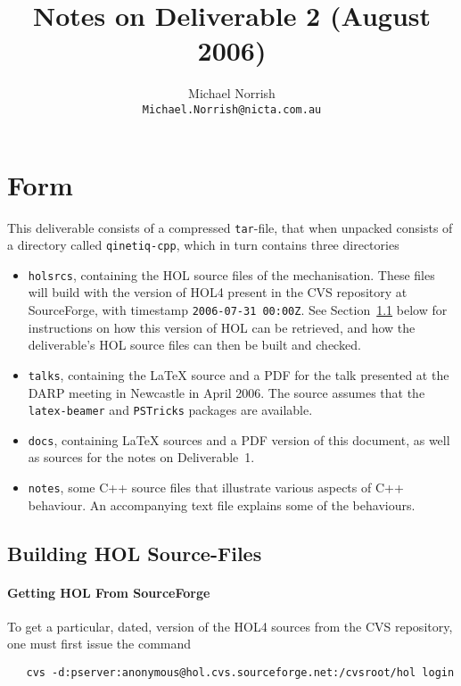 \documentclass[11pt]{article}
\title{Notes on Deliverable 2 (August 2006)}
\author{Michael Norrish\\{\small \texttt{Michael.Norrish@nicta.com.au}}}
\date{}
\begin{document}
\maketitle

\section{Form}

This deliverable consists of a compressed \texttt{tar}-file, that when
unpacked consists of a directory called \texttt{qinetiq-cpp}, which in
turn contains three directories
\begin{itemize}
\item \texttt{holsrcs}, containing the HOL source files of the
  mechanisation.  These files will build with the version of HOL4
  present in the CVS repository at SourceForge, with timestamp
  \texttt{2006-07-31 00:00Z}.  See Section~\ref{sec:getting-hol}
  below for instructions on how this version of HOL can be retrieved,
  and how the deliverable's HOL source files can then be built and
  checked.
\item \texttt{talks}, containing the \LaTeX{} source and a PDF for the
  talk presented at the DARP meeting in Newcastle in April 2006.  The
  source assumes that the \texttt{latex-beamer} and \texttt{PSTricks}
  packages are available.
\item \texttt{docs}, containing \LaTeX{} sources and a PDF version of
  this document, as well as sources for the notes on Deliverable~1.
\item \texttt{notes}, some C++ source files that illustrate various
  aspects of C++ behaviour.  An accompanying text file explains some
  of the behaviours.
\end{itemize}

\subsection{Building HOL Source-Files}
\label{sec:getting-hol}

\paragraph{Getting HOL From SourceForge}

To get a particular, dated, version of the HOL4 sources from the CVS
repository, one must first issue the command

{\small
\begin{verbatim}
   cvs -d:pserver:anonymous@hol.cvs.sourceforge.net:/cvsroot/hol login
\end{verbatim}
}
\end{document}
